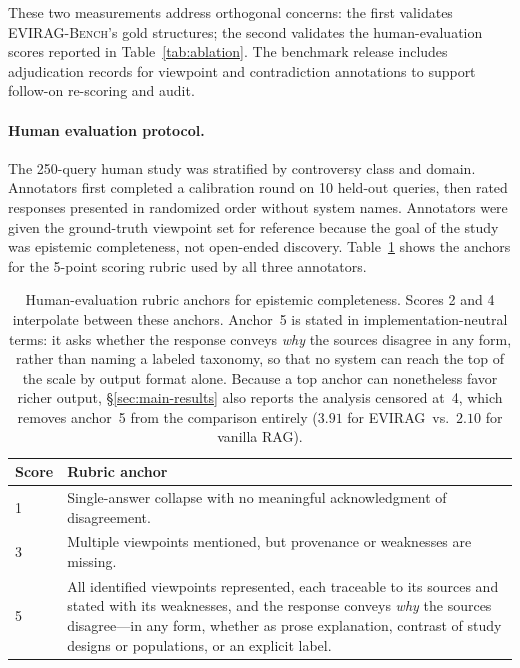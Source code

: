 \documentclass[11pt]{article}
\newcommand{\system}{\textsc{EVIRAG}\xspace}
\newcommand{\bench}{\textsc{EVIRAG-Bench}\xspace}
\begin{document}
These two measurements address orthogonal concerns: the first validates
\bench's gold structures; the second validates the human-evaluation scores
reported in Table~\ref{tab:ablation}.  The benchmark release includes adjudication
records for viewpoint and contradiction annotations to support follow-on
re-scoring and audit.

\paragraph{Human evaluation protocol.}
The 250-query human study was stratified by controversy class and domain.
Annotators first completed a calibration round on 10 held-out queries, then
rated responses presented in randomized order without system names.  Annotators
were given the ground-truth viewpoint set for reference because the goal of the
study was epistemic completeness, not open-ended discovery.
Table~\ref{tab:rubric} shows the anchors for the 5-point scoring rubric used
by all three annotators.

\begin{table}[t]
\centering\small
\setlength{\tabcolsep}{5pt}
\begin{tabular}{@{}lp{5.3cm}@{}}
\toprule
\textbf{Score} & \textbf{Rubric anchor} \\
\midrule
1 & Single-answer collapse with no meaningful acknowledgment of disagreement. \\
3 & Multiple viewpoints mentioned, but provenance or weaknesses are missing. \\
5 & All identified viewpoints represented, each traceable to its sources and
    stated with its weaknesses, and the response conveys \emph{why} the
    sources disagree---in any form, whether as prose explanation, contrast of
    study designs or populations, or an explicit label. \\
\bottomrule
\end{tabular}
\caption{Human-evaluation rubric anchors for epistemic completeness.  Scores 2
and 4 interpolate between these anchors.  Anchor~5 is stated in
implementation-neutral terms: it asks whether the response conveys \emph{why}
the sources disagree in any form, rather than naming a labeled taxonomy, so
that no system can reach the top of the scale by output format alone.  Because
a top anchor can nonetheless favor richer output, \S\ref{sec:main-results} also
reports the analysis censored at~4, which removes anchor~5 from the comparison
entirely ($3.91$ for \system\ vs.\ $2.10$ for vanilla RAG).}
\label{tab:rubric}
\end{table}
\end{document}
